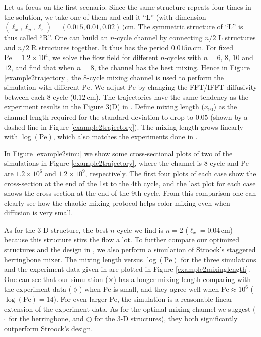 Let us focus on the first scenario. Since the same structure repeats
four times in the solution, we take one of them and call it ``L''
(with dimension $(\ell_x,\ell_y,\ell_z)=(0.015,0.01,0.02)\,)$cm. The symmetric
structure of ``L'' is thus called ``R''. One can build an $n$-cycle
channel by connecting $n/2$ L structures and $n/2$ R structures
together. It thus has the period $0.015n\,\text{cm}$. For fixed
$\text{Pe}=1.2 \times 10^4$, we solve the flow field for different
$n$-cycles with $n=6$, $8$, $10$ and $12$, and find that when $n=8$,
the channel has the best mixing. Hence in Figure
\ref{example2trajectory}, the 8-cycle mixing channel is used to
perform the simulation with different $\text{Pe}$. We adjust
$\text{Pe}$ by changing the FFT/IFFT diffusivity between each
$8$-cycle ($0.12\,\text{cm}$). The trajectories have the same tendency
as the experiment results in the Figure 3(D) in \cite{Stroock2002}.
Define mixing length ($x_{90}$) as the channel length required for the
standard deviation to drop to $0.05$ (shown by a dashed line in Figure
\ref{example2trajectory}). The mixing length grows linearly with
$\log(\text{Pe})$, which also matches the experiments done in
\cite{Stroock2002}.


In Figure \ref{example2simu} we show some cross-sectional plots of two of
the simulations in Figure \ref{example2trajectory}, where the channel
is 8-cycle and $\text{Pe}$ are $1.2\times10^6$ and $1.2\times10^9$,
respectively. The first four plots of each case show the cross-section
at the end of the 1st to the 4th cycle, and the last plot for each
case shows the cross-section at the end of the 9th cycle. From this
comparison one can clearly see how the chaotic mixing protocol helps
color mixing even when diffusion is very small.


As for the 3-D structure, the best $n$-cycle we find is $n=2$
($\ell_x=0.04\, \text{cm}$) because this structure stirs the flow a lot.
To further compare our optimized structures and the design in
\cite{Stroock2002}, we also perform a simulation of Stroock's
staggered herringbone mixer. The mixing length versus
$\log({\text{Pe}})$ for the three simulations and the experiment data
given in \cite{Stroock2002} are plotted in Figure
\ref{example2mixinglength}. One can see that our simulation ($\times$)
has a longer mixing length comparing with the experiment
data ($\lozenge$) when $\text{Pe}$ is small, and they agree well when
$\text{Pe}\approx 10^6$ ($\log(\text{Pe})=14$). For even larger
$\text{Pe}$, the simulation is a reasonable linear extension of the
experiment data. As for the optimal mixing channel we suggest
($\square$ for the herringbone, and $\bigcirc$ for the 3-D structures), they
both significantly outperform Stroock's design.

